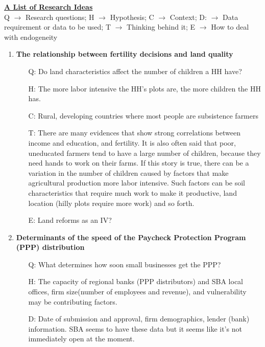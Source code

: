 \documentclass[12pt]{article}
\begin{document}
\textbf{\underline{A List of Research Ideas}} \\
Q $\rightarrow$ Research questions; H $\rightarrow$ Hypothesis; C $\rightarrow$ Context; D: $\rightarrow$ Data requirement or data to be used; T $\rightarrow$ Thinking behind it; E $\rightarrow$ How to deal with endogeneity
\begin{enumerate}
	\item \textbf{The relationship between fertility decisions and land quality}
		\begin{itemize}
			\item[Q:] Do land characteristics affect the number of children a HH have?
			\item[H:] The more labor intensive the HH's plots are, the more children the HH has.
			\item[C:] Rural, developing countries where most people are subsistence farmers 
			\item[T:] There are many evidences that show strong correlations between income and education, and fertility. It is also often said that poor, uneducated farmers tend to have a large number of children, because they need hands to work on their farms. If this story is true, there can be a variation in the number of children caused by factors that make agricultural production more labor intensive. Such factors can be soil characteristics that require much work to make it productive, land location (hilly plots require more work) and so forth.
			\item[E:] Land reforms as an IV?
		\end{itemize}
	\item \textbf{Determinants of the speed of the Paycheck Protection Program (PPP) distribution}
		\begin{itemize}
			\item[Q:] What determines how soon small businesses get the PPP?
			\item[H:] The capacity of regional banks (PPP distributors) and SBA local offices, firm size(number of employees and revenue), and vulnerability may be contributing factors.
			\item[D:] Date of submission and approval, firm demographics, lender (bank) information. SBA seems to have these data but it seems like it's not immediately open at the moment.
		\end{itemize}	

\end{enumerate}
\end{document}

